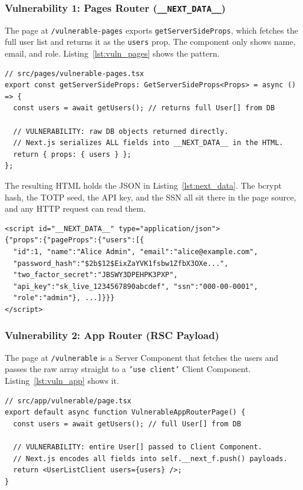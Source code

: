 \documentclass[runningheads]{llncs}
\begin{document}
\subsubsection{Vulnerability 1: Pages Router (\texttt{\_\_NEXT\_DATA\_\_})}

The page at \texttt{/vulnerable-pages} exports
\texttt{getServerSideProps}, which fetches the full user list and returns
it as the \texttt{users} prop.  The component only shows name, email, and
role.  Listing~\ref{lst:vuln_pages} shows the pattern.

\begin{lstlisting}[style=typescript, caption={Vulnerable Pages Router: raw
  database objects returned as props.}, label={lst:vuln_pages}]
// src/pages/vulnerable-pages.tsx
export const getServerSideProps: GetServerSideProps<Props> = async () => {
  const users = await getUsers(); // returns full User[] from DB

  // VULNERABILITY: raw DB objects returned directly.
  // Next.js serializes ALL fields into __NEXT_DATA__ in the HTML.
  return { props: { users } };
};
\end{lstlisting}

The resulting HTML holds the JSON in Listing~\ref{lst:next_data}.  The
bcrypt hash, the TOTP seed, the API key, and the SSN all sit there in the
page source, and any HTTP request can read them.

\begin{lstlisting}[style=json, caption={Excerpt of \_\_NEXT\_DATA\_\_ in
  the HTML response, showing leaked credentials.}, label={lst:next_data}]
<script id="__NEXT_DATA__" type="application/json">
{"props":{"pageProps":{"users":[{
  "id":1, "name":"Alice Admin", "email":"alice@example.com",
  "password_hash":"$2b$12$EixZaYVK1fsbw1ZfbX3OXe...",
  "two_factor_secret":"JBSWY3DPEHPK3PXP",
  "api_key":"sk_live_1234567890abcdef", "ssn":"000-00-0001",
  "role":"admin"}, ...]}}}
</script>
\end{lstlisting}

\subsubsection{Vulnerability 2: App Router (RSC Payload)}

The page at \texttt{/vulnerable} is a Server Component that fetches the
users and passes the raw array straight to a \texttt{'use client'} Client
Component.  Listing~\ref{lst:vuln_app} shows it.

\begin{lstlisting}[style=typescript, caption={Vulnerable App Router:
  raw objects crossing the RSC serialization boundary.},
  label={lst:vuln_app}]
// src/app/vulnerable/page.tsx
export default async function VulnerableAppRouterPage() {
  const users = await getUsers(); // full User[] from DB

  // VULNERABILITY: entire User[] passed to Client Component.
  // Next.js encodes all fields into self.__next_f.push() payloads.
  return <UserListClient users={users} />;
}
\end{lstlisting}
\end{document}
